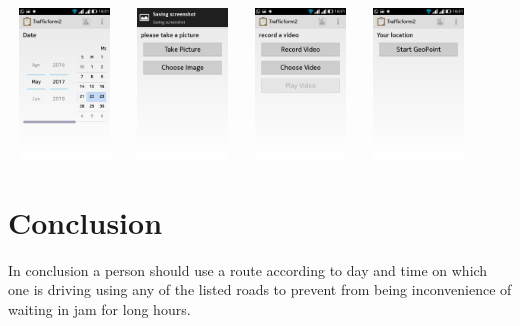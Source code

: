 \documentclass[options]{article}
\begin{document}
\includegraphics[width =3cm,height=4cm]{1.png}
\includegraphics[width =3cm,height=4cm]{2.png}
\includegraphics[width =3cm,height=4cm]{3.png}
\includegraphics[width =3cm,height=4cm]{4.png}


\section{\textbf{Conclusion }} 
In conclusion a person should use a route according to day and time on which one is driving using any of the listed roads to prevent from being inconvenience of waiting in jam for long hours.
\end{document}

